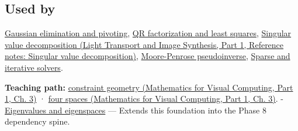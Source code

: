 \subsection{Used by}\label{appendix-8572a4a060c1-used-by}

\hypertarget{appendix-8572a4a060c1-used-by}{}

\hyperref[appendix-f6e77f4a200f]{Gaussian elimination and pivoting}, \hyperref[appendix-c3421e6b4f2c]{QR factorization and least squares}, \href{../04-Light-Transport-and-Image-Synthesis-P01/main.pdf\#appendix-1fad5e7f36fa}{Singular value decomposition (Light Transport and Image Synthesis, Part 1, Reference notes: Singular value decomposition)}, \hyperref[appendix-541306fdbc1b]{Moore-Penrose pseudoinverse}, \hyperref[appendix-67c87a3d9e94]{Sparse and iterative solvers}.

\textbf{Teaching path:} \href{../02-Mathematics-for-Visual-Computing-P01/main.pdf\#01-foundations-i-ch019-a-linear-equation-is-a-measurement-and-several-equations-are-geometry}{constraint geometry (Mathematics for Visual Computing, Part 1, Ch. 3)} · \href{../02-Mathematics-for-Visual-Computing-P01/main.pdf\#01-foundations-i-ch019-rank-separates-what-the-measurements-determine-from-what-they-leave-free}{four spaces (Mathematics for Visual Computing, Part 1, Ch. 3)}. - \hyperref[appendix-0b3be18411f9]{Eigenvalues and eigenspaces} --- Extends this foundation into the Phase 8 dependency spine.
